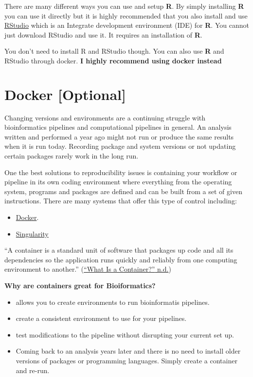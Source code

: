 \documentclass[
]{book}
\providecommand{\tightlist}{%
  \setlength{\itemsep}{0pt}\setlength{\parskip}{0pt}}
\begin{document}
There are many different ways you can use and setup \textbf{R}. By simply installing \textbf{R} you can use it directly but it is highly recommended that you also install and use \href{https://rstudio.com/products/rstudio/download/}{RStudio} which is an Integrate development environment (IDE) for \textbf{R}. You cannot just download RStudio and use it. It requires an installation of \textbf{R}.

You don't need to install R and RStudio though. You can also use \textbf{R} and RStudio through docker. \textbf{I highly recommend using docker instead}

\hypertarget{docker-optional}{%
\section{Docker {[}Optional{]}}\label{docker-optional}}

Changing versions and environments are a continuing struggle with bioinformatics pipelines and computational pipelines in general. An analysis written and performed a year ago might not run or produce the same results when it is run today. Recording package and system versions or not updating certain packages rarely work in the long run.

One the best solutions to reproducibility issues is containing your workflow or pipeline in its own coding environment where everything from the operating system, programs and packages are defined and can be built from a set of given instructions. There are many systems that offer this type of control including:

\begin{itemize}
\tightlist
\item
  \href{https://www.docker.com/}{Docker}.
\item
  \href{https://sylabs.io/}{Singularity}
\end{itemize}

``A container is a standard unit of software that packages up code and all its dependencies so the application runs quickly and reliably from one computing environment to another.'' (\protect\hyperlink{ref-docker}{{``What Is a Container?''} n.d.})

\textbf{Why are containers great for Bioiformatics?}

\begin{itemize}
\tightlist
\item
  allows you to create environments to run bioinformatis pipelines.
\item
  create a consistent environment to use for your pipelines.
\item
  test modifications to the pipeline without disrupting your current set up.
\item
  Coming back to an analysis years later and there is no need to install older versions of packages or programming languages. Simply create a container and re-run.
\end{itemize}
\end{document}
